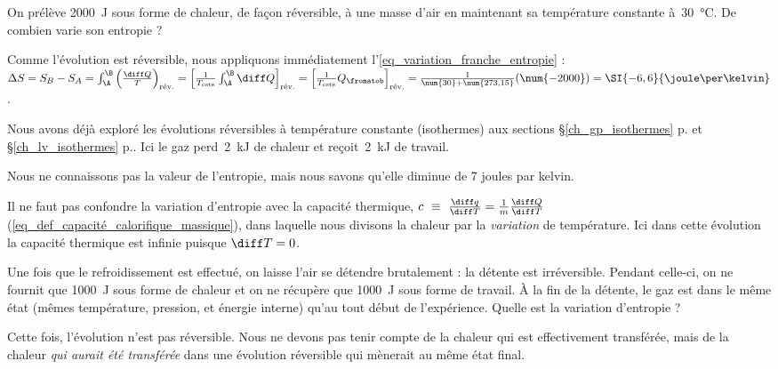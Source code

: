 		\begin{anexample}
		\label{exemple_delta_entropie_basics}
			On prélève \SI{2000}{\joule} sous forme de chaleur, de façon réversible, à une masse d’air en maintenant sa température constante à~\SI{30}{\degreeCelsius}. De combien varie son entropie ?
				\begin{answer}
					Comme l’évolution est réversible, nous appliquons immédiatement l’\cref{eq_variation_franche_entropie} : $\Delta S
						= S_B - S_A
						= \int_\A^\B \left( \frac{\diff Q}{T} \right)_\text{rév.}
						= \left[\frac{1}{T_\text{cste}} \int_\A^\B \diff Q \right]_\text{rév.}
						= \left[\frac{1}{T_\text{cste}} Q_\fromatob \right]_\text{rév.}
						= \frac{1}{\num{30} + \num{273,15}} (\num{-2000})
						= \SI{-6,6}{\joule\per\kelvin}$.
					\begin{remark}Nous avons déjà exploré les évolutions réversibles à température constante (isothermes) aux sections \S\ref{ch_gp_isothermes} p.\pageref{ch_gp_isothermes} et \S\ref{ch_lv_isothermes} p.\pageref{ch_lv_isothermes}. Ici le gaz perd~\SI{2}{\kilo\joule} de chaleur et reçoit~\SI{2}{\kilo\joule} de travail.\end{remark}
					\begin{remark}Nous ne connaissons pas la valeur de l’entropie, mais nous savons qu’elle diminue de 7 \si{joules} par \si{kelvin}.\end{remark}
					\begin{remark}Il ne faut pas confondre la variation d’entropie avec la capacité thermique, $c\ \equiv \ \frac{\diff q}{\diff T} = \frac{1}{m} \frac{\diff Q}{\diff T}$ (\ref{eq_def_capacité_calorifique_massique}), dans laquelle nous divisons la chaleur par la \emph{variation} de température. Ici dans cette évolution la capacité thermique est infinie puisque $\diff T = 0$.\end{remark}
				\end{answer}
			
			Une fois que le refroidissement est effectué, on laisse l’air se détendre brutalement : la détente est irréversible. Pendant celle-ci, on ne fournit que \SI{1000}{\joule} sous forme de chaleur et on ne récupère que \SI{1000}{\joule} sous forme de travail. À la fin de la détente, le gaz est dans le même état (mêmes température, pression, et énergie interne) qu’au tout début de l’expérience. Quelle est la variation d’entropie ?
				\begin{answer} Cette fois, l’évolution n’est pas réversible. Nous ne devons pas tenir compte de la chaleur qui est effectivement transférée, mais de la chaleur \emph{qui aurait été transférée} dans une évolution réversible qui mènerait au même état final.
				

\end{answer}
\end{anexample}
